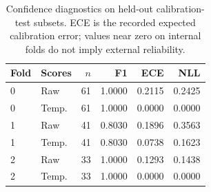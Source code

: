 \begin{table}[t]
\caption{Confidence diagnostics on held-out calibration-test subsets. ECE is the recorded expected calibration error; values near zero on internal folds do not imply external reliability.}
\label{tab:calibration}
\centering
\small
\setlength{\tabcolsep}{4pt}
\begin{tabular}{llrrrr}
\toprule
Fold & Scores & $n$ & F1 & ECE & NLL \\
\midrule
0 & Raw & 61 & 1.0000 & 0.2115 & 0.2425 \\
0 & Temp. & 61 & 1.0000 & 0.0000 & 0.0000 \\
1 & Raw & 41 & 0.8030 & 0.1896 & 0.3563 \\
1 & Temp. & 41 & 0.8030 & 0.0738 & 0.1623 \\
2 & Raw & 33 & 1.0000 & 0.1293 & 0.1438 \\
2 & Temp. & 33 & 1.0000 & 0.0000 & 0.0000 \\
\bottomrule
\end{tabular}
\end{table}
